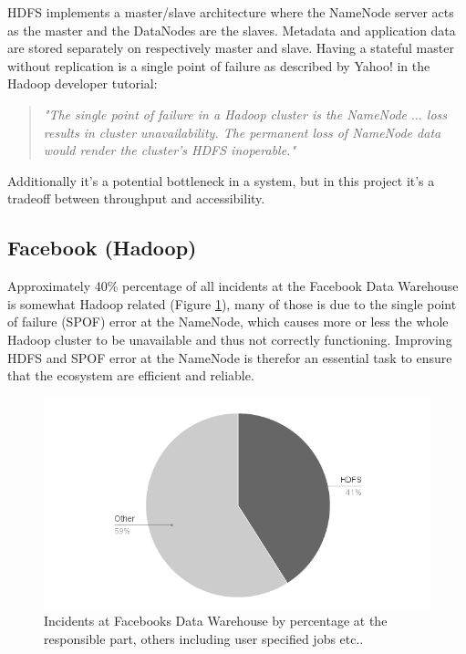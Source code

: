 HDFS implements a master/slave architecture where the NameNode server acts as the master and the DataNodes are the slaves. Metadata and application data are stored separately on respectively master and slave. Having a stateful master without replication is a single point of failure  as described by Yahoo! in the Hadoop developer tutorial:

\begin{quotation}
	\textit{"The single point of failure in a Hadoop cluster is the NameNode $\ldots$ loss results in cluster unavailability. The permanent loss of NameNode data would render the cluster's HDFS inoperable."}\cite{YahooDocumentation}
\end{quotation}

Additionally it's a potential bottleneck in a system, but in this project it's a tradeoff between throughput and accessibility.

\subsection*{Facebook (Hadoop)}
Approximately 40\% percentage of all incidents at the Facebook Data Warehouse is somewhat Hadoop related (Figure \ref{fig:fb-hadoop-incidents}), many of those is due to the single point of failure (SPOF) error at the NameNode, which causes more or less the whole Hadoop cluster to be unavailable and thus not correctly functioning. Improving HDFS and SPOF error at the NameNode is therefor an essential task to ensure that the ecosystem are efficient and reliable.

\begin{figure}[h!]
	\centering
	\includegraphics[scale=0.48]{img/fb-hadoop-incidents.png}
	\caption[Incidents at Facebooks Data Warehouse]{Incidents at Facebooks Data Warehouse by percentage at the responsible part, others including user specified jobs etc.\cite{FacebookHadoopImprovement}. \label{fig:fb-hadoop-incidents}}
\end{figure}

